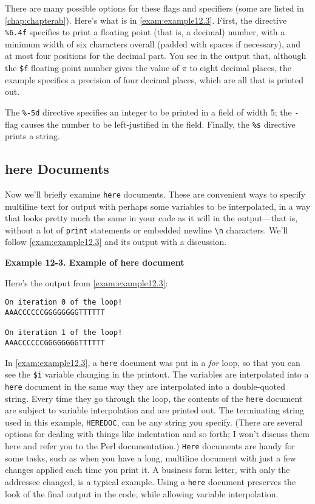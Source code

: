 There are many possible options for these flags and specifiers (some are listed in \autoref{chap:chapterab}). Here's what is in \autoref{exam:example12.3}. First, the directive \verb|%6.4f| specifies to print a floating point (that is, a decimal) number, with a minimum width of six characters overall (padded with spaces if necessary), and at most four positions for the decimal part. You see in the output that, although the \verb|$f| floating-point number gives the value of $\pi$ to eight decimal places, the example specifies a precision of four decimal places, which are all that is printed out.  

The \verb|%-5d| directive specifies an integer to be printed in a field of width 5; the \verb|-| flag causes the number to be left-justified in the field. Finally, the \verb|%s| directive prints a string.

\subsection{here Documents}
Now we'll briefly examine \verb|here| documents. These are convenient ways to specify multiline text for output with perhaps some variables to be interpolated, in a way that looks pretty much the same in your code as it will in the output—that is, without a lot of \verb|print| statements or embedded newline \verb|\n| characters. We'll follow \autoref{exam:example12.3} and its output with a discussion. 

\textbf{Example 12-3. Example of here document}


Here's the output from \autoref{exam:example12.3}:

\begin{lstlisting}
On iteration 0 of the loop!
AAACCCCCCGGGGGGGGTTTTTT

On iteration 1 of the loop!
AAACCCCCCGGGGGGGGTTTTTT
\end{lstlisting}

In \autoref{exam:example12.3}, a \verb|here| document was put in a \textit{for} loop, so that you can see the \verb|$i| variable changing in the printout. The variables are interpolated into a \verb|here| document in the same way they are interpolated into a double-quoted string. Every time they go through the loop, the contents of the \verb|here| document are subject to variable interpolation and are printed out. The terminating string used in this example, \verb|HEREDOC|, can be any string you specify. (There are several options for dealing with things like indentation and so forth; I won't discuss them here and refer you to the Perl documentation.) \verb|Here| documents are handy for some tasks, such as when you have a long, multiline document with just a few changes applied each time you print it. A business form letter, with only the addressee changed, is a typical example. Using a \verb|here| document preserves the look of the final output in the code, while allowing variable interpolation.

